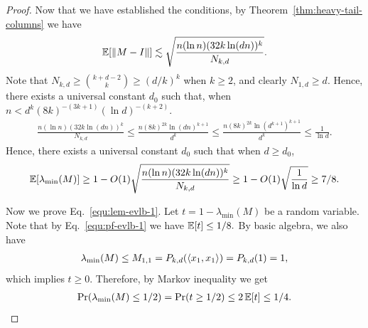 \begin{proof}
    Now that we have established the conditions, by Theorem~\ref{thm:heavy-tail-columns} we have
    \begin{align}
        \operatorname*{\mathbb{E}}[\|M-I\|]\lesssim \sqrt{\frac{n(\ln n)(32k\ln(dn))^k}{N_{k,d}}}.
    \end{align}
    Note that $N_{k,d}\ge \binom{k+d-2}{k}\ge (d/k)^k$ when $k\ge 2$, and clearly $N_{1,d}\ge d$. Hence, there exists a universal constant $d_0$ such that, when $n<d^k(8k)^{-(3k+1)}(\ln d)^{-(k+2)}$.
    \begin{align}
        \frac{n(\ln n)(32k\ln(dn))^k}{N_{k,d}}\le \frac{n(8k)^{2k}\ln(dn)^{k+1}}{d^k}\le  \frac{n(8k)^{2k}\ln(d^{k+1})^{k+1}}{d^k}\le \frac{1}{\ln d}.
    \end{align}
    Hence, there exists a universal constant $d_0$ such that when $d\ge d_0$, 
    \begin{align}
        \operatorname*{\mathbb{E}}[\lambda_{\min}(M)]\ge 1-O(1)\sqrt{\frac{n(\ln n)(32k\ln(dn))^k}{N_{k,d}}}\ge 1-O(1)\sqrt{\frac{1}{\ln d}}\ge 7/8.
    \end{align}
    
    Now we prove Eq.~\eqref{equ:lem-evlb-1}. Let $t=1-\lambda_{\min}(M)$ be a random variable. Note that by Eq.~\eqref{equ:pf-evlb-1} we have $\operatorname*{\mathbb{E}}[t]\le 1/8.$ By basic algebra, we also have
    \begin{align}
        \lambda_{\min}(M)\le M_{1,1}=P_{k,d}(\left<x_1, x_1\right>)=P_{k,d}(1)=1,
    \end{align}
    which implies $t\ge 0.$
    Therefore, by Markov inequality we get
    \begin{align}
        \Pr(\lambda_{\min}(M)\le 1/2)=\Pr(t\ge 1/2)\le 2\operatorname*{\mathbb{E}}[t]\le 1/4.
    \end{align}
\end{proof}